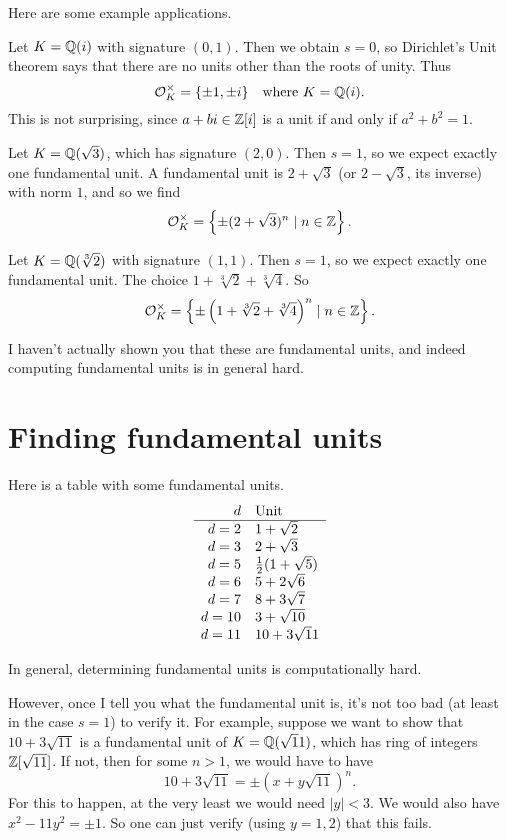 Here are some example applications.
\begin{example}
	\listhack
	\begin{enumerate}[(a)]
		\ii Let $K = \mathbb Q(i)$ with signature $(0,1)$.
		Then we obtain $s = 0$, so Dirichlet's Unit theorem says that there are no
		units other than the roots of unity.
		Thus
		\[ \mathcal O_K^\times = \{\pm 1, \pm i\} \quad\text{where } K = \mathbb Q(i). \]
		This is not surprising,
		since $a+bi \in \mathbb Z[i]$ is a unit if and only if $a^2+b^2 = 1$.

		\ii Let $K = \mathbb Q(\sqrt 3)$, which has signature $(2,0)$.
		Then $s=1$, so we expect exactly one fundamental unit.
		A fundamental unit is $2+\sqrt3$ (or $2-\sqrt3$, its inverse) with norm $1$, and so we find
		\[ \mathcal O_K^\times = \left\{ \pm (2+\sqrt3)^n \mid n \in \mathbb Z \right\}.  \]

		\ii Let $K = \mathbb Q(\sqrt[3]{2})$ with signature $(1,1)$.
		Then $s=1$, so we expect exactly one fundamental unit.
		The choice $1 + \sqrt[3]{2} + \sqrt[3]{4}$. So
		\[ \mathcal O_K^\times
			= \left\{ \pm \left( 1+\sqrt[3]{2}+\sqrt[3]{4} \right)^n \mid n \in \mathbb Z \right\}. \]
	\end{enumerate}
\end{example}

I haven't actually shown you that these are fundamental units,
and indeed computing fundamental units is in general hard.

\section{Finding fundamental units}
Here is a table with some fundamental units.
\[
	\begin{array}{rl}
		d & \text{Unit} \\ \hline
		d=2 & 1+\sqrt 2 \\
		d=3 & 2+\sqrt3 \\
		d=5 & \frac{1}{2}(1+\sqrt5) \\
		d=6 & 5+2\sqrt6 \\
		d=7 & 8+3\sqrt7 \\
		d=10 & 3+\sqrt{10} \\
		d=11 & 10+3\sqrt11
	\end{array}
\]

In general, determining fundamental units is computationally hard.

However, once I tell you what the fundamental unit is, it's not too bad
(at least in the case $s=1$) to verify it.
For example,
suppose we want to show that $10 + 3\sqrt{11}$ is a fundamental unit of $K = \mathbb Q(\sqrt 11)$,
which has ring of integers $\mathbb Z[\sqrt{11}]$.
If not, then for some $n > 1$, we would have to have
\[ 10 + 3 \sqrt{11} = \pm \left( x+y\sqrt{11} \right)^n. \]
For this to happen, at the very least we would need $\left\lvert y \right\rvert < 3$.
We would also have $x^2-11y^2 = \pm 1$.
So one can just verify (using $y= 1,2$) that this fails.

